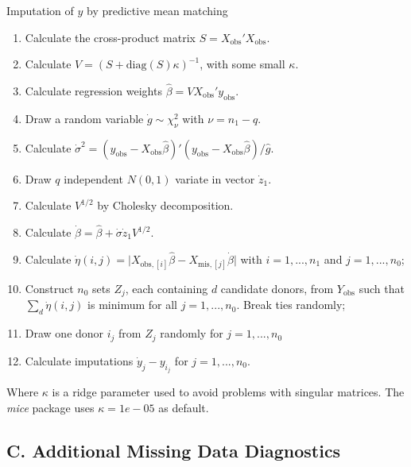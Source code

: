 \documentclass[12pt,]{article}
\begin{document}
\begin{algorithm}[H]
\label{alg:pmm-alg}
\caption{Imputation of $y$ by predictive mean matching}
\DontPrintSemicolon
\SetAlgoLined
\BlankLine

\begin{enumerate}
  \item Calculate the cross-product matrix $S=X_{\text{obs}}'X_{\text{obs}}$.
  \item Calculate $V = (S + \text{diag}(S)\kappa)^{-1}$, with some small $\kappa$.
  \item Calculate regression weights $\hat{\beta} = V X_{\text{obs}}' y_{\text{obs}}$.
  \item Draw a random variable $\dot{g} \sim \chi^2_{\nu}$ with $\nu = n_1 - q$.
  \item Calculate $\dot{\sigma}^2 = (y_{\text{obs}} - X_{\text{obs}} \hat{\beta})' (y_{\text{obs}} - X_{\text{obs}} \hat{\beta}) / \hat{g}$.
  \item Draw $q$ independent $N(0,1)$ variate in vector $\dot{z}_1$.
  \item Calculate $V^{1/2}$ by Cholesky decomposition.
  \item Calculate $\dot{\beta} = \hat{\beta} + \dot{\sigma} \dot{z}_1 V^{1/2}$.
  \item Calculate $\dot{\eta}(i,j) = \vert X_{\text{obs},[i]} \hat{\beta} - X_{\text{mis},[j]} \dot{\beta} \vert$ with $i=1,...,n_1$ and $j=1,...,n_0$; 
  \item Construct $n_0$ sets $Z_j$, each containing $d$ candidate donors, from $Y_{\text{obs}}$ such that $\sum_d \dot{\eta}(i,j)$ is minimum for all $j=1,...,n_0$.  Break ties randomly;
  \item Draw one donor $i_j$ from $Z_j$ randomly for $j=1,...,n_0$
  \item Calculate imputations $\dot{y}_j - y_{i_j}$ for $j=1,...,n_0$.
\end{enumerate}

\BlankLine
\end{algorithm}

Where \(\kappa\) is a ridge parameter used to avoid problems with
singular matrices. The \emph{mice} package uses \(\kappa=1e-05\) as
default.

\newpage

\subsection*{C. Additional Missing Data
Diagnostics}\label{c.-additional-missing-data-diagnostics}
\end{document}
